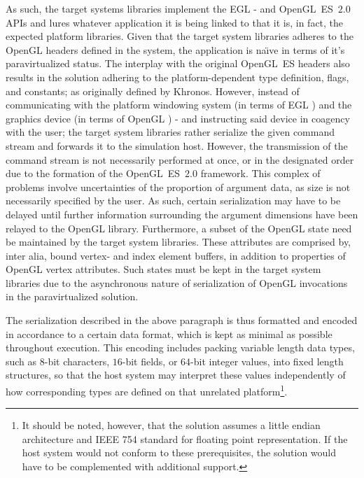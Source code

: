 As such, the target systems libraries implement the EGL - and OpenGL~ES~$2.0$ APIs and lures whatever application it is being linked to that it is, in fact, the expected platform libraries.
Given that the target system libraries adheres to the OpenGL headers defined in the system, the application is na\"{\i}ve in terms of it's paravirtualized status.
The interplay with the original OpenGL~ES headers also results in the solution adhering to the platform-dependent type definition, flags, and constants; as originally defined by Khronos.
However, instead of communicating with the platform windowing system (in terms of EGL ) and the graphics device (in terms of OpenGL ) - and instructing said device in coagency with the user; the target system libraries rather serialize the given command stream and forwards it to the simulation host.
However, the transmission of the command stream is not necessarily performed at once, or in the designated order due to the formation of the OpenGL~ES~$2.0$ framework.
This complex of problems involve uncertainties of the proportion of argument data, as size is not necessarily specified by the user.
As such, certain serialization may have to be delayed until further information surrounding the argument dimensions have been relayed to the OpenGL library.
Furthermore, a subset of the OpenGL state need be maintained by the target system libraries.
These attributes are comprised by, inter alia, bound vertex- and index element buffers, in addition to properties of OpenGL vertex attributes.
Such states must be kept in the target system libraries due to the asynchronous nature of serialization of OpenGL invocations in the paravirtualized solution.

The serialization described in the above paragraph is thus formatted and encoded in accordance to a certain data format, which is kept as minimal as possible throughout execution.
This encoding includes packing variable length data types, such as $8$-bit characters, $16$-bit fields, or $64$-bit integer values, into fixed length structures, so that the host system may interpret these values independently of how corresponding types are defined on that unrelated platform\footnote{It should be noted, however, that the solution assumes a little endian architecture and IEEE 754 standard for floating point representation. If the host system would not conform to these prerequisites, the solution would have to be complemented with additional support.}.

